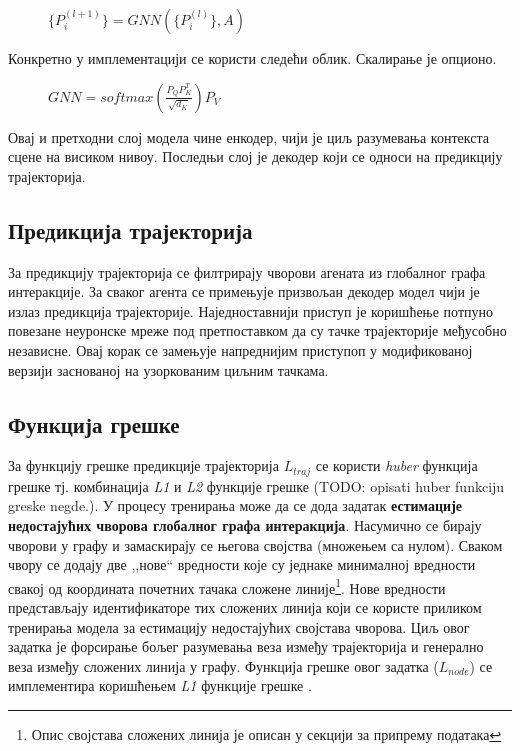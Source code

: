 \documentclass[11pt,oneside]{memoir}
\begin{document}
\begin{figure}[H]
  \centering
  $\{P^{(l+1)}_{i}\} = GNN(\{P^{(l)}_{i}\}, A)$
\end{figure}

\noindent Конкретно у имплементацији се користи следећи облик. Скалирање је опционо.

\begin{figure}[H]
  \centering
  $GNN = softmax(\frac{P_{Q}P^{T}_{K}}{\sqrt{d_{K}}})P_{V}$
\end{figure}

Овај и претходни слој модела чине енкодер, чији је циљ разумевања контекста сцене на висиком нивоу. Последњи слој је декодер
који се односи на предикцију трајекторија.

\subsection{Предикција трајекторија}

За предикцију трајекторија се филтрирају чворови агената из глобалног графа интеракције. За сваког агента се примењује призвољан декодер модел
чији је излаз предикција трајекторије. Наједноставнији приступ је коришћење потпуно повезане неуронске мреже под претпоставком да су 
тачке трајекторије међусобно независне. Овај корак се замењује напреднијим приступоп у модификованој верзији заснованој на узоркованим циљним тачкама.

\subsection{Функција грешке}

За функцију грешке предикције трајекторија $L_{traj}$ се користи \textit{huber} функција грешке тј. комбинација \textit{L1} и \textit{L2} функције грешке 
(TODO: opisati huber funkciju greske negde.). 
У процесу тренирања може да се дода задатак \textbf{естимације недостајућих чворова глобалног графа интеракција}. Насумично се бирају чворови у графу и замаскирају
се његова својства (множењем са нулом). Сваком чвору се додају две ,,нове`` вредности које су једнаке минималној вредности свакој од координата почетних 
тачака сложене линије\footnote{Опис својстава сложених линија је описан у секцији за припрему података}. Нове вредности представљају идентификаторе
тих сложених линија који се користе приликом тренирања модела за естимацију недостајућих својстава чворова. Циљ овог задатка је форсирање бољег разумевања
веза између трајекторија и генерално веза између сложених линија у графу. Функција грешке овог задатка ($L_{node}$) се имплементира коришћењем \textit{L1}
функције грешке \cite{vectornet}.
\end{document}
